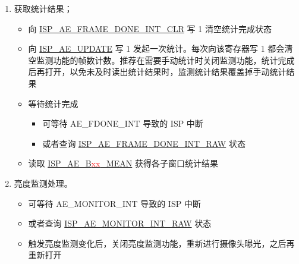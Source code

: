 \documentclass[main\_\_CN.tex]{subfiles}
\begin{document}
\begin{enumerate}
    \item 获取统计结果；
    \begin{itemize}
        \item 向 \hyperref[fielddesc:ISPAEFRAMEDONEINTCLR]{ISP\_AE\_FRAME\_DONE\_INT\_CLR} 写 1 清空统计完成状态
        \item 向 \hyperref[fielddesc:ISPAEUPDATE]{ISP\_AE\_UPDATE} 写 1 发起一次统计。每次向该寄存器写 1 都会清空监测功能的帧数计数。推荐在需要手动统计时关闭监测功能，统计完成后再打开，以免未及时读出统计结果时，监测统计结果覆盖掉手动统计结果
        \item 等待统计完成
        \begin{itemize}
            \item 可等待 AE\_FDONE\_INT 导致的 ISP 中断
            \item 或者查询 \hyperref[fielddesc:ISPAEFRAMEDONEINTRAW]{ISP\_AE\_FRAME\_DONE\_INT\_RAW} 状态
        \end{itemize}
        \item 读取 \hyperref[fielddesc:ISPAEB00MEAN]{ISP\_AE\_B\textcolor{red}{xx}\_MEAN} 获得各子窗口统计结果
    \end{itemize}

    \item 亮度监测处理。
    \begin{itemize}
        \item 可等待 AE\_MONITOR\_INT 导致的 ISP 中断
        \item 或者查询 \hyperref[fielddesc:ISPAEMONITORINTRAW]{ISP\_AE\_MONITOR\_INT\_RAW} 状态
        \item 触发亮度监测变化后，关闭亮度监测功能，重新进行摄像头曝光，之后再重新打开
    \end{itemize}
\end{enumerate}
\end{document}
